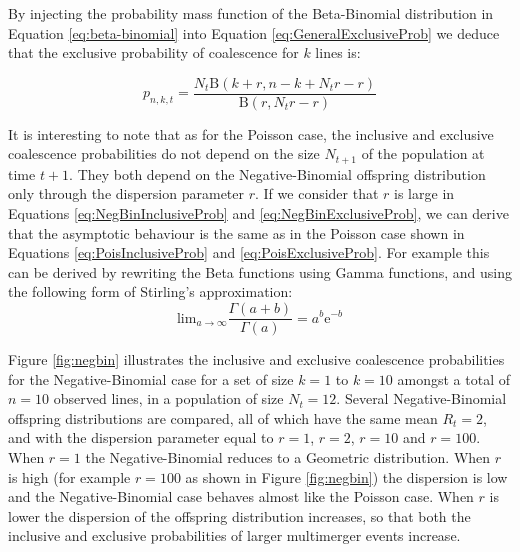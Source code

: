 \documentclass{article}
\renewcommand{\eqref}[1]{\ref{#1}}
\begin{document}
By injecting the probability mass function of the Beta-Binomial distribution in Equation
\eqref{eq:beta-binomial} into Equation 
\eqref{eq:GeneralExclusiveProb} we deduce that 
the exclusive probability of coalescence for $k$ lines is:

\begin{equation}
p_{n,k,t}=\frac{N_t \mathrm{B}(k+r, n-k+N_t r-r)}{\mathrm{B}(r, N_t r-r)}
\label{eq:NegBinExclusiveProb}
\end{equation}

It is interesting to note that as for the Poisson case, the inclusive and exclusive coalescence probabilities do not depend on the size $N_{t+1}$ of the population at time $t+1$.
They both depend on the 
Negative-Binomial offspring distribution only through the dispersion parameter $r$.
If we consider that $r$ is large in Equations \eqref{eq:NegBinInclusiveProb} and
\eqref{eq:NegBinExclusiveProb}, we can 
derive that the asymptotic behaviour is the same as in the Poisson case  
shown in Equations  \eqref{eq:PoisInclusiveProb} and
\eqref{eq:PoisExclusiveProb}. For example this can be derived by rewriting the
Beta functions using Gamma functions, and using the following form of Stirling's approximation:
\begin{equation}
\mathrm{lim}_{a \rightarrow \infty} \frac{\Gamma(a+b)}{\Gamma(a)}=a^b \mathrm{e}^{-b}
\label{eq:stirling}
\end{equation}

Figure \ref{fig:negbin} illustrates the inclusive and exclusive coalescence probabilities for
the Negative-Binomial case for a set of size $k=1$ to $k=10$ amongst a total of $n=10$
 observed lines, in a population of size $N_t=12$. 
Several Negative-Binomial offspring distributions are compared, 
all of which have the same mean $R_t=2$,
and with the dispersion parameter equal to $r=1$, $r=2$, $r=10$ and $r=100$.
When $r=1$ the Negative-Binomial reduces to a Geometric distribution.
When $r$ is high (for example $r=100$ as shown in Figure \ref{fig:negbin}) 
the dispersion is low and the Negative-Binomial case 
behaves almost like the Poisson case. When $r$ is lower the dispersion of the
offspring distribution increases, so that 
both the inclusive and exclusive probabilities of larger multimerger events increase.
\end{document}
